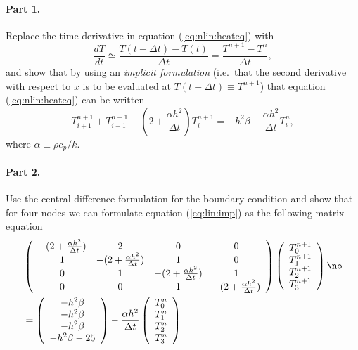 \documentclass[graybox,sectrefs,envcountresetchap,open=right,final]{svmonodo}
\makeatletter
\newenvironment{doconceexercise}{}{}
\newcounter{doconceexercisecounter}%
\newcommand\listofexercises{
\chapter*{List of Exercises
          \@mkboth{List of Exercises}{List of Exercises}}
\markboth{List of Exercises}{List of Exercises}
\@starttoc{loe}
}
\makeatother
\begin{document}
\begin{doconceexercise}

                             

\paragraph{Part 1.}
Replace the time derivative in equation (\ref{eq:nlin:heateq}) with
\begin{equation}
\frac{dT}{dt}\simeq\frac{T(t+\Delta t)-T(t)}{\Delta t}=\frac{T^{n+1}-T^n}{\Delta t}, 
\label{eq:lin:dt}
\end{equation}
and show that by using an \emph{implicit formulation} (i.e.~that the second derivative with respect to $x$ is to be evaluated at $T(t+\Delta t)\equiv T^{n+1}$) that equation (\ref{eq:nlin:heateq}) can be written
\begin{equation}
T_{i+1}^{n+1}+T_{i-1}^{n+1}-(2+\frac{\alpha h^2}{\Delta t})T_i^{n+1}=-h^2\beta-\frac{\alpha h^2 }{\Delta t}T_i^n,
\label{eq:lin:imp} 
\end{equation}
where $\alpha\equiv\rho c_p/k$.

\paragraph{Part 2.}

Use the central difference formulation for the boundary condition and show that for four nodes we can formulate equation (\ref{eq:lin:imp}) as the following matrix equation
\begin{align}
&\left(
\begin{array}{cccc}
-(2+\frac{\alpha h^2}{\Delta t})&2&0&0\\ 
1&-(2+\frac{\alpha h^2}{\Delta t})&1&0\\ 
0&1&-(2+\frac{\alpha h^2}{\Delta t})&1\\ 
0&0&1&-(2+\frac{\alpha h^2}{\Delta t})\\ 
\end{array}
\right)
\left(
\begin{array}{c}
T_0^{n+1}\\ 
T_1^{n+1}\\ 
T_2^{n+1}\\ 
T_3^{n+1}\\ 
\end{array}
\right)\no\\ 
&=
\left(
\begin{array}{c}
-h^2\beta\\ 
-h^2\beta\\ 
-h^2\beta\\ 
-h^2\beta-25
\end{array}
\right)
-\frac{\alpha h^2 }{\Delta t}
\left(
\begin{array}{c}
T_0^n\\ 
T_1^n\\ 
T_2^n\\ 
T_3^n\\ 
\end{array}
\right)
\end{align}
\label{eq:lin:heatfull}


\end{doconceexercise}
\end{document}
